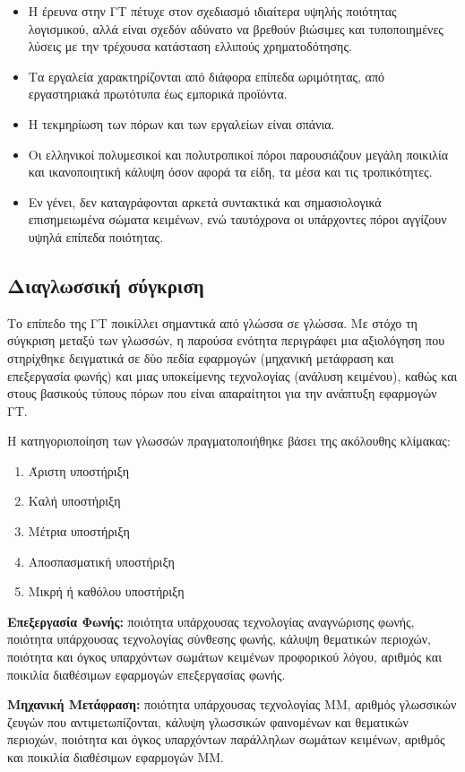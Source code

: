 \documentclass[]{../../metanetpaper}
\begin{document}
\begin{multicols}{2}
\begin{itemize}
\item Η έρευνα στην ΓΤ πέτυχε στον σχεδιασμό ιδιαίτερα υψηλής ποιότητας λογισμικού, αλλά είναι σχεδόν αδύνατο να βρεθούν βιώσιμες και τυποποιημένες λύσεις με την τρέχουσα κατάσταση ελλιπούς χρηματοδότησης.
\item Τα εργαλεία χαρακτηρίζονται από διάφορα επίπεδα ωριμότητας, από εργαστηριακά πρωτότυπα έως εμπορικά προϊόντα.
\item Η τεκμηρίωση των πόρων και των εργαλείων είναι σπάνια.
\item Οι ελληνικοί πολυμεσικοί και πολυτροπικοί πόροι παρουσιάζουν μεγάλη ποικιλία και ικανοποιητική κάλυψη όσον αφορά τα είδη, τα μέσα και τις τροπικότητες.
\item Εν γένει, δεν καταγράφονται αρκετά συντακτικά και σημασιολογικά επισημειωμένα σώματα κειμένων, ενώ ταυτόχρονα οι υπάρχοντες πόροι αγγίζουν υψηλά επίπεδα ποιότητας.	
\end{itemize}

\subsection{Διαγλωσσική σύγκριση}

Το επίπεδο της ΓΤ ποικίλλει σημαντικά από γλώσσα σε γλώσσα. Με στόχο τη σύγκριση μεταξύ των γλωσσών, η παρούσα ενότητα περιγράφει μια αξιολόγηση που στηρίχθηκε δειγματικά σε δύο πεδία εφαρμογών (μηχανική μετάφραση και επεξεργασία φωνής) και μιας υποκείμενης τεχνολογίας (ανάλυση κειμένου), καθώς και στους βασικούς τύπους πόρων που είναι απαραίτητοι για την ανάπτυξη εφαρμογών ΓΤ.

Η κατηγοριοποίηση των γλωσσών πραγματοποιήθηκε βάσει της ακόλουθης κλίμακας:

\begin{enumerate}
\item Άριστη υποστήριξη
\item Καλή υποστήριξη
\item Μέτρια υποστήριξη
\item Αποσπασματική υποστήριξη
\item Μικρή ή καθόλου υποστήριξη
\end{enumerate}

\textbf{Επεξεργασία Φωνής:} ποιότητα υπάρχουσας τεχνολογίας αναγνώρισης φωνής, ποιότητα υπάρχουσας τεχνολογίας σύνθεσης φωνής, κάλυψη θεματικών περιοχών, ποιότητα και όγκος υπαρχόντων σωμάτων κειμένων προφορικού λόγου, αριθμός και ποικιλία διαθέσιμων εφαρμογών επεξεργασίας φωνής.

\textbf{Μηχανική Μετάφραση:} ποιότητα υπάρχουσας τεχνολογίας ΜΜ, αριθμός γλωσσικών ζευγών που αντιμετωπίζονται, κάλυψη γλωσσικών φαινομένων και θεματικών περιοχών, ποιότητα και όγκος υπαρχόντων παράλληλων σωμάτων κειμένων, αριθμός και ποικιλία διαθέσιμων εφαρμογών ΜΜ.


\end{multicols}
\end{document}
